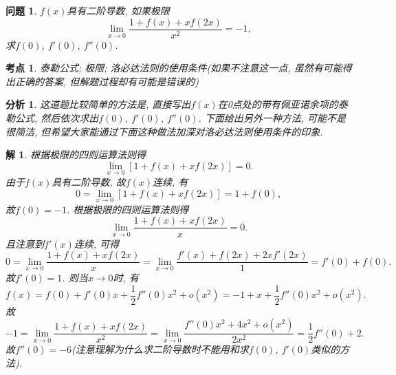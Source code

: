 \documentclass[a4paper, 12pt]{ctexart}
\theoremstyle{plain}
\newtheorem{problem}{问题}
\theoremstyle{nonumberplain}
\newtheorem{solution}{解}
\newtheorem{analysis}{分析}
\newtheorem{category}{考点}
\begin{document}
\begin{problem}
    $f(x)$具有二阶导数, 如果极限
    \begin{equation}
        \lim_{x\to 0}\frac{1+f(x)+xf(2x)}{x^2}=-1,
    \end{equation}
    求$f(0)$, $f'(0)$, $f''(0)$.
\end{problem}
\begin{category}
    泰勒公式; 极限; 洛必达法则的使用条件(如果不注意这一点, 虽然有可能得出正确的答案, 但解题过程却有可能是错误的)
\end{category}
\begin{analysis}
    这道题比较简单的方法是, 直接写出$f(x)$在0点处的带有佩亚诺余项的泰勒公式, 然后依次求出$f(0)$, $f'(0)$, $f''(0)$. 下面给出另外一种方法, 可能不是很简洁, 但希望大家能通过下面这种做法加深对洛必达法则使用条件的印象.
\end{analysis}
\begin{solution}
    根据极限的四则运算法则得
    \begin{equation}
        \lim_{x\to 0}[1+f(x)+xf(2x)]=0.
    \end{equation}
    由于$f(x)$具有二阶导数, 故$f(x)$连续, 有
    \begin{equation}
        0 = \lim_{x\to 0}[1+f(x)+xf(2x)] = 1+f(0),
    \end{equation}
    故$f(0)=-1$. 根据极限的四则运算法则得
    \begin{equation}
        \lim_{x\to 0}\frac{1+f(x)+xf(2x)}{x}=0.
    \end{equation}
    且注意到$f'(x)$连续, 可得
    \begin{equation}
        0 = \lim_{x\to 0}\frac{1+f(x)+xf(2x)}{x}=\lim_{x\to 0}\frac{f'(x)+f(2x)+2xf'(2x)}{1} = f'(0) + f(0).
    \end{equation}
    故$f'(0)=1$. 则当$x\to 0$时, 有
    \begin{equation}
        f(x) = f(0) + f'(0)x + \frac{1}{2}f''(0)x^2 + o(x^2) = -1 + x + \frac{1}{2}f''(0)x^2 + o(x^2).
    \end{equation}
    故
    \begin{equation}
        -1 = \lim_{x\to 0}\frac{1+f(x)+xf(2x)}{x^2} = \lim_{x\to 0}\frac{f''(0)x^2+4x^2+o(x^2)}{2x^2}= \frac{1}{2}f''(0)+2.
    \end{equation}
    故$f''(0)=-6$(注意理解为什么求二阶导数时不能用和求$f(0)$, $f'(0)$类似的方法).
\end{solution}
\end{document}
